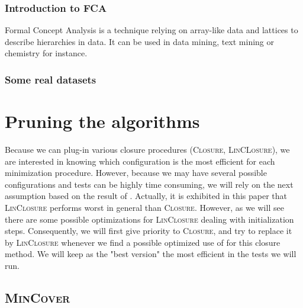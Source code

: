 \subsubsection{Introduction to FCA}

Formal Concept Analysis is a technique relying on array-like data and lattices
to describe hierarchies in data. It can be used in data mining, text mining or
chemistry for instance.

\subsubsection{Some real datasets}

\section{Pruning the algorithms}

Because we can plug-in various closure procedures (\textsc{Closure}, \textsc{LinCLosure}), we are interested in knowing which configuration is
the most efficient for each minimization procedure. However, because we may
have several possible configurations and tests can be highly time consuming,
we will rely on the next assumption based on the result of \cite{bazhanov_optimizations_2014}. Actually, it is exhibited in this paper
that \textsc{LinClosure} performs worst in general than \textsc{Closure}. However, as we will see there are some possible optimizations for \textsc{LinClosure} dealing with initialization steps. Consequently, 
we will first give priority to \textsc{Closure}, and try to replace it 
by \textsc{LinClosure} whenever we find a possible optimized use of 
for this closure method. We will keep as the "best version" the most efficient
in the tests we will run.

\subsection{\textsc{MinCover}}

